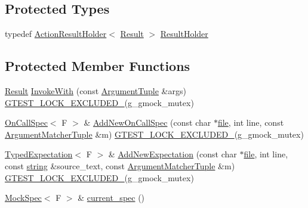 \subsection*{Protected Types}
\begin{DoxyCompactItemize}
\item 
typedef \hyperlink{classtesting_1_1internal_1_1_action_result_holder}{Action\+Result\+Holder}$<$ \hyperlink{classtesting_1_1internal_1_1_function_mocker_base_aa50abc4055b4d3a14ad64c317bccec8d}{Result} $>$ \hyperlink{classtesting_1_1internal_1_1_function_mocker_base_aa4e1b2ee217676c9e70c3006b19a8074}{Result\+Holder}
\end{DoxyCompactItemize}
\subsection*{Protected Member Functions}
\begin{DoxyCompactItemize}
\item 
\hyperlink{classtesting_1_1internal_1_1_function_mocker_base_aa50abc4055b4d3a14ad64c317bccec8d}{Result} \hyperlink{classtesting_1_1internal_1_1_function_mocker_base_a869ec713f000b4e7829c660efc25e8cd}{Invoke\+With} (const \hyperlink{classtesting_1_1internal_1_1_function_mocker_base_a336432a07e544af4ffb8103603471ca3}{Argument\+Tuple} \&args) \hyperlink{gtest-port_8h_a69abff5a4efdd07bd5faebe3dd318d06}{G\+T\+E\+S\+T\+\_\+\+L\+O\+C\+K\+\_\+\+E\+X\+C\+L\+U\+D\+E\+D\+\_\+}(g\+\_\+gmock\+\_\+mutex)
\item 
\hyperlink{classtesting_1_1internal_1_1_on_call_spec}{On\+Call\+Spec}$<$ F $>$ \& \hyperlink{classtesting_1_1internal_1_1_function_mocker_base_a22ece3b6e8d24f11d8f4ba9c17b737c4}{Add\+New\+On\+Call\+Spec} (const char $\ast$\hyperlink{_07copy_08_2_read_camera_model_8m_a151631b2fd2bb776ef06c9f440a7ed74}{file}, int line, const \hyperlink{classtesting_1_1internal_1_1_function_mocker_base_ab790bcb1dcf57fa6659365386723ae5a}{Argument\+Matcher\+Tuple} \&m) \hyperlink{gtest-port_8h_a69abff5a4efdd07bd5faebe3dd318d06}{G\+T\+E\+S\+T\+\_\+\+L\+O\+C\+K\+\_\+\+E\+X\+C\+L\+U\+D\+E\+D\+\_\+}(g\+\_\+gmock\+\_\+mutex)
\item 
\hyperlink{classtesting_1_1internal_1_1_typed_expectation}{Typed\+Expectation}$<$ F $>$ \& \hyperlink{classtesting_1_1internal_1_1_function_mocker_base_aa2c35c565f08d3649436af443ece468f}{Add\+New\+Expectation} (const char $\ast$\hyperlink{_07copy_08_2_read_camera_model_8m_a151631b2fd2bb776ef06c9f440a7ed74}{file}, int line, const \hyperlink{namespacetesting_1_1internal_a8e8ff5b11e64078831112677156cb111}{string} \&source\+\_\+text, const \hyperlink{classtesting_1_1internal_1_1_function_mocker_base_ab790bcb1dcf57fa6659365386723ae5a}{Argument\+Matcher\+Tuple} \&m) \hyperlink{gtest-port_8h_a69abff5a4efdd07bd5faebe3dd318d06}{G\+T\+E\+S\+T\+\_\+\+L\+O\+C\+K\+\_\+\+E\+X\+C\+L\+U\+D\+E\+D\+\_\+}(g\+\_\+gmock\+\_\+mutex)
\item 
\hyperlink{classtesting_1_1internal_1_1_mock_spec}{Mock\+Spec}$<$ F $>$ \& \hyperlink{classtesting_1_1internal_1_1_function_mocker_base_a744318106e20b346f4f1efbf5a601644}{current\+\_\+spec} ()
\end{DoxyCompactItemize}

